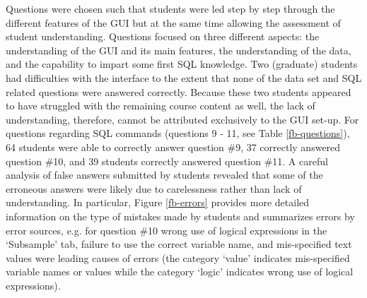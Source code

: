 \documentclass[11pt]{tise_style}
\begin{document}
Questions were chosen such that students were led step by step through the different features of the GUI but at the same time allowing the assessment of student understanding. Questions focused on three different aspects: the understanding of the GUI and its main features, the understanding of the data, and the capability to impart some first SQL knowledge.  Two (graduate) students had difficulties with the interface to the extent that none of the data set and SQL related questions were answered correctly. Because these two students appeared to have struggled with the remaining course content as well, the lack of understanding, therefore, cannot be attributed exclusively to the GUI set-up. For questions regarding SQL commands (questions 9 - 11, see Table \ref{fb-questions}), 64 students were able to correctly answer question \#9, 37 correctly answered question \#10, and 39 students correctly answered question \#11. A careful analysis of false answers submitted by students revealed that some of the erroneous answers were likely due to carelessness rather than lack of understanding. In particular, Figure \ref{fb-errors} provides more detailed information on the type of mistakes made by students and summarizes errors by error sources, e.g. for question \#10 wrong use of logical expressions in the `Subsample' tab, failure to use the correct variable name, and mis-specified text values were leading causes of errors (the category `value' indicates mis-specified variable names or values while the category `logic' indicates wrong use of logical expressions).  
\end{document}
